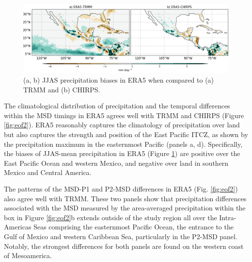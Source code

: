 \begin{figure}[t!]
\includegraphics[width=\linewidth]{figures/fig_Era5}
\caption[ERA5 precipitation biases]{ (a, b) JJAS precipitation biases in ERA5 when compared to (a) TRMM and (b) CHIRPS. }
\label{fig:era5_bias_pr}
\end{figure}
 
 The climatological distribution of precipitation and the temporal differences within the MSD timings in ERA5 agrees well with TRMM and CHIRPS (Figure \ref{fig:eof2}). ERA5 reasonably captures the climatology of precipitation over land but also captures the strength and position of the East Pacific ITCZ, as shown by the precipitation maximum in the easternmost Pacific (panels a, d).  Specifically, the biases of JJAS-mean precipitation in ERA5  (Figure \ref{fig:era5_bias_pr}) are positive over the East Pacific Ocean and western Mexico, and negative over land in southern Mexico and Central America.
 
  The patterns of the MSD-P1 and P2-MSD differences in ERA5 (Fig. \ref{fig:eof2}) also agree well with TRMM. These two panels show that precipitation differences associated with the MSD measured by the area-averaged precipitation within the box in Figure \ref{fig:eof2}b extends outside of the study region all over the Intra-Americas Seas comprising the easternmost Pacific Ocean, the entrance to the Gulf of Mexico and western Caribbean Sea, particularly in the P2-MSD panel. Notably, the strongest differences for both panels are found on the western coast of Mesoamerica. 
 
